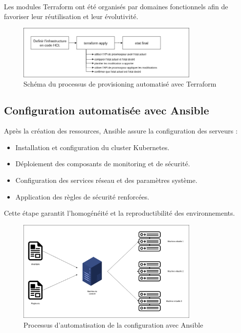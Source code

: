 Les modules Terraform ont été organisés par domaines fonctionnels afin de favoriser leur réutilisation et leur évolutivité.

\begin{figure}[H]
	\centering
	\includegraphics[width=0.8\textwidth]{figures/terraform-provisioning.png}
	\caption{Schéma du processus de provisioning automatisé avec Terraform}
\end{figure}

\subsection*{Configuration automatisée avec Ansible}

Après la création des ressources, Ansible assure la configuration des serveurs :
\begin{itemize}
	\item Installation et configuration du cluster Kubernetes.
	\item Déploiement des composants de monitoring et de sécurité.
	\item Configuration des services réseau et des paramètres système.
	\item Application des règles de sécurité renforcées.
\end{itemize}

Cette étape garantit l’homogénéité et la reproductibilité des environnements.

\begin{figure}[H]
	\centering
	\includegraphics[width=0.8\textwidth]{figures/ansible-configuration.png}
	\caption{Processus d'automatisation de la configuration avec Ansible}
\end{figure}

